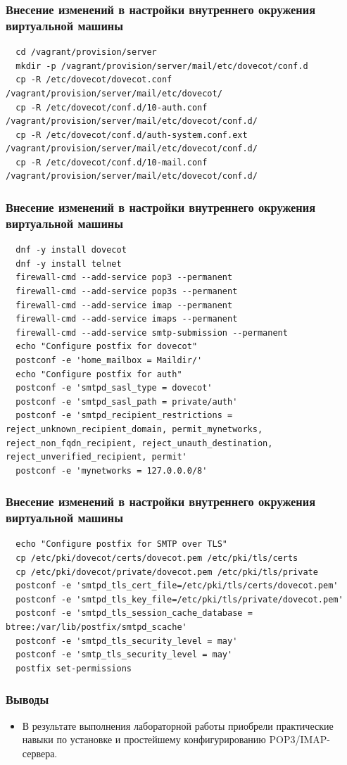\begin{frame}
\frametitle{Внесение изменений в настройки внутреннего окружения виртуальной машины}
\begin{verbatim}
  cd /vagrant/provision/server
  mkdir -p /vagrant/provision/server/mail/etc/dovecot/conf.d
  cp -R /etc/dovecot/dovecot.conf /vagrant/provision/server/mail/etc/dovecot/
  cp -R /etc/dovecot/conf.d/10-auth.conf /vagrant/provision/server/mail/etc/dovecot/conf.d/
  cp -R /etc/dovecot/conf.d/auth-system.conf.ext /vagrant/provision/server/mail/etc/dovecot/conf.d/
  cp -R /etc/dovecot/conf.d/10-mail.conf /vagrant/provision/server/mail/etc/dovecot/conf.d/
\end{verbatim}
\end{frame}

\begin{frame}
\frametitle{Внесение изменений в настройки внутреннего окружения виртуальной машины}
\begin{verbatim}
  dnf -y install dovecot
  dnf -y install telnet
  firewall-cmd --add-service pop3 --permanent
  firewall-cmd --add-service pop3s --permanent
  firewall-cmd --add-service imap --permanent
  firewall-cmd --add-service imaps --permanent
  firewall-cmd --add-service smtp-submission --permanent
  echo "Configure postfix for dovecot"
  postconf -e 'home_mailbox = Maildir/'
  echo "Configure postfix for auth"
  postconf -e 'smtpd_sasl_type = dovecot'
  postconf -e 'smtpd_sasl_path = private/auth'
  postconf -e 'smtpd_recipient_restrictions = reject_unknown_recipient_domain, permit_mynetworks, reject_non_fqdn_recipient, reject_unauth_destination, reject_unverified_recipient, permit'
  postconf -e 'mynetworks = 127.0.0.0/8'
\end{verbatim}
\end{frame}

\begin{frame}
\frametitle{Внесение изменений в настройки внутреннего окружения виртуальной машины}
\begin{verbatim}
  echo "Configure postfix for SMTP over TLS"
  cp /etc/pki/dovecot/certs/dovecot.pem /etc/pki/tls/certs
  cp /etc/pki/dovecot/private/dovecot.pem /etc/pki/tls/private
  postconf -e 'smtpd_tls_cert_file=/etc/pki/tls/certs/dovecot.pem'
  postconf -e 'smtpd_tls_key_file=/etc/pki/tls/private/dovecot.pem'
  postconf -e 'smtpd_tls_session_cache_database = btree:/var/lib/postfix/smtpd_scache'
  postconf -e 'smtpd_tls_security_level = may'
  postconf -e 'smtp_tls_security_level = may'
  postfix set-permissions
\end{verbatim}
\end{frame}

\begin{frame}
\frametitle{Выводы}
\begin{itemize}
    \item В результате выполнения лабораторной работы приобрели практические навыки по установке и простейшему конфигурированию POP3/IMAP-сервера.
\end{itemize}
\end{frame}

